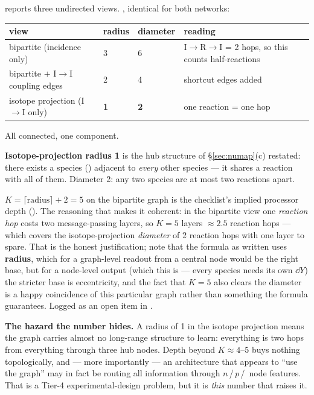  reports three undirected views.
, identical for both networks:

\begin{center}
\begin{tabularx}{\textwidth}{@{}L{5.2cm} L{1.6cm} L{1.9cm} Y@{}}
\toprule
\textbf{view} & \textbf{radius} & \textbf{diameter} & \textbf{reading} \\
\midrule
bipartite (incidence only) & 3 & 6 &
  I$\to$R$\to$I = 2 hops, so this counts half-reactions \\
bipartite $+$ I$\to$I coupling edges & 2 & 4 & shortcut edges added \\
isotope projection (I$\to$I only) & \textbf{1} & \textbf{2} &
  one reaction = one hop \\
\bottomrule
\end{tabularx}
\end{center}

All connected, one component.

\textbf{Isotope-projection radius 1} is the hub structure of
\S\ref{sec:numap}(c) restated: there exists a species () adjacent to
\emph{every} other species --- it shares a reaction with all of them. Diameter
2: any two species are at most two reactions apart.

\textbf{$K = \lceil\text{radius}\rceil + 2 = 5$} on the bipartite graph is the
checklist's implied processor depth (). The
reasoning that makes it coherent: in the bipartite view one \emph{reaction hop}
costs two message-passing layers, so $K = 5$ layers $\approx 2.5$ reaction hops
--- which covers the isotope-projection \emph{diameter} of 2 reaction hops with
one layer to spare. That is the honest justification; note that the formula as
written uses \textbf{radius}, which for a graph-level readout from a central
node would be the right base, but for a node-level output (which this is ---
every species needs its own $\dd Y$) the stricter base is eccentricity, and the
fact that $K = 5$ also clears the diameter is a happy coincidence of this
particular graph rather than something the formula guarantees. Logged as an open
item in .

\textbf{The hazard the number hides.} A radius of 1 in the isotope projection
means the graph carries almost no long-range structure to learn: everything is
two hops from everything through three hub nodes. Depth beyond $K \approx 4$--5
buys nothing topologically, and --- more importantly --- an architecture that
appears to ``use the graph'' may in fact be routing all information through
$n$\,/\,$p$\,/\, node features. That is a Tier-4
experimental-design problem, but it is \emph{this} number that raises it.

